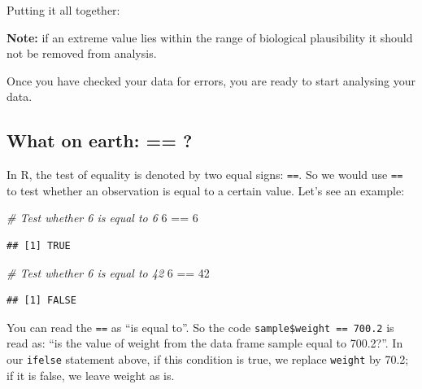 \documentclass[
]{memoir}
\newenvironment{Shaded}{\begin{snugshade}}{\end{snugshade}}
\newcommand{\CommentTok}[1]{\textcolor[rgb]{0.56,0.35,0.01}{\textit{#1}}}
\newcommand{\DecValTok}[1]{\textcolor[rgb]{0.00,0.00,0.81}{#1}}
\newcommand{\FloatTok}[1]{\textcolor[rgb]{0.00,0.00,0.81}{#1}}
\newcommand{\FunctionTok}[1]{\textcolor[rgb]{0.00,0.00,0.00}{#1}}
\newcommand{\NormalTok}[1]{#1}
\newcommand{\OtherTok}[1]{\textcolor[rgb]{0.56,0.35,0.01}{#1}}
\newcommand{\SpecialCharTok}[1]{\textcolor[rgb]{0.00,0.00,0.00}{#1}}
\begin{document}
Putting it all together:

\begin{Shaded}
\end{Shaded}

\textbf{Note:} if an extreme value lies within the range of biological plausibility it should not be removed from analysis.

Once you have checked your data for errors, you are ready to start analysing your data.

\hypertarget{what-on-earth}{%
\subsection{What on earth: == ?}\label{what-on-earth}}

In R, the test of equality is denoted by two equal signs: \texttt{==}. So we would use \texttt{==} to test whether an observation is equal to a certain value. Let's see an example:

\begin{Shaded}
\begin{Highlighting}[]
\CommentTok{\# Test whether 6 is equal to 6}
\DecValTok{6} \SpecialCharTok{==} \DecValTok{6}
\end{Highlighting}
\end{Shaded}

\begin{verbatim}
## [1] TRUE
\end{verbatim}

\begin{Shaded}
\begin{Highlighting}[]
\CommentTok{\# Test whether 6 is equal to 42}
\DecValTok{6} \SpecialCharTok{==} \DecValTok{42}
\end{Highlighting}
\end{Shaded}

\begin{verbatim}
## [1] FALSE
\end{verbatim}

You can read the \texttt{==} as ``is equal to''. So the code \texttt{sample\$weight\ ==\ 700.2} is read as: ``is the value of weight from the data frame sample equal to 700.2?''. In our \texttt{ifelse} statement above, if this condition is true, we replace \texttt{weight} by 70.2; if it is false, we leave weight as is.
\end{document}

